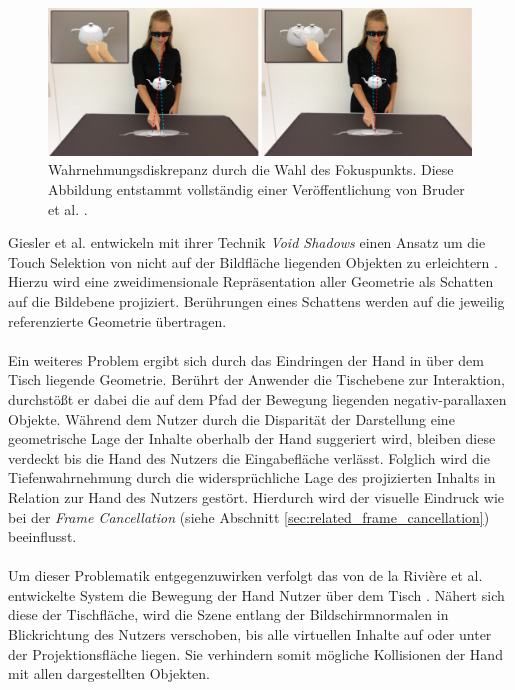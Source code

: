 \begin{figure}
	\begin{center}
		\includegraphics[width=12cm]{img/fokussierung.pdf}
	\end{center}
	\caption{Wahrnehmungsdiskrepanz durch die Wahl des Fokuspunkts. Diese Abbildung entstammt vollständig einer Veröffentlichung von Bruder et al. \cite{bruder:2013}.}
	\label{fig:fokussierung}
\end{figure}

Giesler et al. entwickeln mit ihrer Technik \emph{Void Shadows} einen Ansatz um die Touch Selektion von nicht auf der Bildfläche liegenden Objekten zu erleichtern \cite{giesler:2014}. Hierzu wird eine zweidimensionale Repräsentation aller Geometrie als Schatten auf die Bildebene projiziert. Berührungen eines Schattens werden auf die jeweilig referenzierte Geometrie übertragen.
\\\\
Ein weiteres Problem ergibt sich durch das Eindringen der Hand in über dem Tisch liegende Geometrie. Berührt der Anwender die Tischebene zur Interaktion, durchstößt er dabei die auf dem Pfad der Bewegung liegenden negativ-parallaxen Objekte. Während dem Nutzer durch die Disparität der Darstellung eine geometrische Lage der Inhalte oberhalb der Hand suggeriert wird, bleiben diese verdeckt bis die Hand des Nutzers die Eingabefläche verlässt. Folglich wird die Tiefenwahrnehmung durch die widersprüchliche Lage des projizierten Inhalts in Relation zur Hand des Nutzers gestört. Hierdurch wird der visuelle Eindruck wie bei der \emph{Frame Cancellation} (siehe Abschnitt \ref{sec:related_frame_cancellation}) beeinflusst.
\\\\
Um dieser Problematik entgegenzuwirken verfolgt das von de la Rivière et al. entwickelte System die Bewegung der Hand Nutzer über dem Tisch \linebreak \cite{delariviere:2010}. Nähert sich diese der Tischfläche, wird die Szene entlang der Bildschirmnormalen in Blickrichtung des Nutzers verschoben, bis alle virtuellen Inhalte auf oder unter der Projektionsfläche liegen. Sie verhindern somit mögliche Kollisionen der Hand mit allen dargestellten Objekten.


